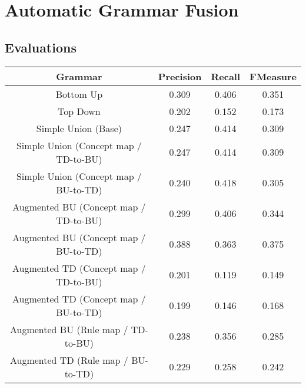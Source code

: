 \documentclass[a4paper,10pt]{article}
\begin{document}
\scriptsize
\section{Automatic Grammar Fusion}
\subsection{Evaluations}
\begin{center}
 \label{tab:title} 
\begin{tabular}{|c||c|c|c|}
\hline
Grammar&Precision&Recall&FMeasure\\
\hline
\hline
Bottom Up&0.309&0.406&0.351 \\
\hline
Top Down&0.202&0.152&0.173 \\
\hline
Simple Union (Base)&0.247&0.414&0.309 \\
\hline
Simple Union (Concept map / TD-to-BU)&0.247&0.414&0.309 \\
\hline
Simple Union (Concept map / BU-to-TD)&0.240&0.418&0.305 \\
\hline
Augmented BU (Concept map / TD-to-BU)&0.299&0.406&0.344 \\
\hline
Augmented BU (Concept map / BU-to-TD)&0.388&0.363&0.375 \\
\hline
Augmented TD (Concept map / TD-to-BU)&0.201&0.119&0.149 \\
\hline
Augmented TD (Concept map / BU-to-TD)&0.199&0.146&0.168 \\
\hline
Augmented BU (Rule map / TD-to-BU)&0.238&0.356&0.285 \\
\hline
Augmented TD (Rule map / BU-to-TD)&0.229&0.258&0.242 \\
\hline\end{tabular}
\end{center}
\end{document}
